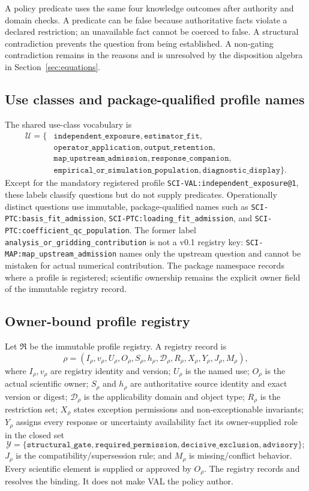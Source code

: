 A policy predicate uses the same four knowledge outcomes after authority and
domain checks. A predicate can be false because authoritative facts violate a
declared restriction; an unavailable fact cannot be coerced to false. A
structural contradiction prevents the question from being established. A
non-gating contradiction remains in the reasons and is unresolved by the
disposition algebra in Section~\ref{sec:equations}.

\subsection{Use classes and package-qualified profile names}

The shared use-class vocabulary is
\begin{align*}
\mathcal U=\{&\texttt{independent\_exposure},
\texttt{estimator\_fit},\\
&\texttt{operator\_application},
\texttt{output\_retention},\\
&\texttt{map\_upstream\_admission},
\texttt{response\_companion},\\
&\texttt{empirical\_or\_simulation\_population},
\texttt{diagnostic\_display}\}.
\end{align*}
Except for the mandatory registered profile
\nolinkurl{SCI-VAL:independent_exposure@1}, these labels classify questions but
do not supply predicates. Operationally distinct questions use immutable,
package-qualified names such as
\nolinkurl{SCI-PTC:basis_fit_admission},
\nolinkurl{SCI-PTC:loading_fit_admission}, and
\nolinkurl{SCI-PTC:coefficient_qc_population}.
The former label \nolinkurl{analysis_or_gridding_contribution} is not a v0.1
registry key: \nolinkurl{SCI-MAP:map_upstream_admission} names only the
upstream question and cannot be mistaken for actual numerical contribution.
The package namespace records where a profile is registered; scientific
ownership remains the explicit owner field of the immutable registry record.

\subsection{Owner-bound profile registry}

Let $\mathfrak R$ be the immutable profile registry. A registry record is
\[
 \rho=(I_\rho,v_\rho,U_\rho,O_\rho,S_\rho,h_\rho,
        \mathcal D_\rho,R_\rho,X_\rho,Y_\rho,J_\rho,M_\rho),
\]
where $I_\rho,v_\rho$ are registry identity and version; $U_\rho$ is the
named use; $O_\rho$ is the actual scientific owner; $S_\rho$ and $h_\rho$
are authoritative source identity and exact version or digest;
$\mathcal D_\rho$ is the applicability domain and object type; $R_\rho$ is
the restriction set; $X_\rho$ states exception permissions and
non-exceptionable invariants; $Y_\rho$ assigns every response or uncertainty
availability fact its owner-supplied role in the closed set
\[
 \mathcal Y=\{\texttt{structural\_gate},
 \texttt{required\_permission},
 \texttt{decisive\_exclusion},
 \texttt{advisory}\};
\]
$J_\rho$ is the compatibility/supersession
rule; and $M_\rho$ is missing/conflict behavior. Every scientific element is
supplied or approved by $O_\rho$. The registry records and resolves the
binding. It does not make VAL the policy author.

